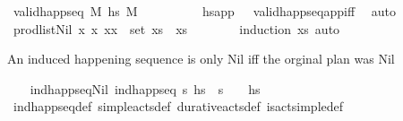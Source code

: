 \begin{isabellebody}
\ {\isachardoublequoteopen}valid{\isacharunderscore}{\kern0pt}happ{\isacharunderscore}{\kern0pt}seq\ M\ {\isacharquery}{\kern0pt}hs{\isacharprime}{\kern0pt}\ M{\isacharprime}{\kern0pt}{\isachardoublequoteclose}\isanewline
\ \ \ \ \ \ \ \ \isamarkupfalse%
\ hs{\isacharprime}{\kern0pt}{\isacharunderscore}{\kern0pt}app\ {}\ {}\ valid{\isacharunderscore}{\kern0pt}happ{\isacharunderscore}{\kern0pt}seq{\isacharunderscore}{\kern0pt}app{\isacharunderscore}{\kern0pt}iff\ \isamarkupfalse%
\ auto\isanewline
\ \ \ \ \isamarkupfalse%
\isanewline
\ \ \isamarkupfalse%
%
\endisatagproof
{\isafoldproof}%
%
\isadelimproof
\isanewline
%
\endisadelimproof
\isanewline
\ \ \isamarkupfalse%
\ prod{\isacharunderscore}{\kern0pt}list{\isacharunderscore}{\kern0pt}Nil{\isacharcolon}{\kern0pt}\ {\isachardoublequoteopen}{\isasymforall}x\ x\ {\isacharparenleft}{\kern0pt}xx\ {\isasymnotin}\ set\ xs\ {\isasymLongrightarrow}\ xs\ {\isacharequal}{\kern0pt}\ {\isacharbrackleft}{\kern0pt}{\isacharbrackright}{\kern0pt}{\isachardoublequoteclose}\isanewline
%
\isadelimproof
\ \ \ \ %
\endisadelimproof
%
\isatagproof
{}\isamarkupfalse%
\ {\isacharparenleft}{\kern0pt}induction\ xs{\isacharparenright}{\kern0pt}\ auto%
\endisatagproof
{\isafoldproof}%
%
\isadelimproof
%
\endisadelimproof
%
\begin{isamarkuptext}%
An induced happening sequence is only Nil iff the orginal plan was Nil%
\end{isamarkuptext}\isamarkuptrue%
\ \ \isamarkupfalse%
\ ind{\isacharunderscore}{\kern0pt}happ{\isacharunderscore}{\kern0pt}seq{\isacharunderscore}{\kern0pt}Nil{\isacharcolon}{\kern0pt}\ {\isachardoublequoteopen}ind{\isacharunderscore}{\kern0pt}happ{\isacharunderscore}{\kern0pt}seq\ {\isasympi}s\ hs\ {\isasymLongrightarrow}\ {\isasympi}s\ {\isacharequal}{\kern0pt}\ {\isacharbrackleft}{\kern0pt}{\isacharbrackright}{\kern0pt}\ {\isasymlongleftrightarrow}\ hs\ {\isacharequal}{\kern0pt}\ {\isacharbrackleft}{\kern0pt}{\isacharbrackright}{\kern0pt}{\isachardoublequoteclose}\isanewline
%
\isadelimproof
\ \ \ \ %
\endisadelimproof
%
\isatagproof
{}\isamarkupfalse%
\ ind{\isacharunderscore}{\kern0pt}happ{\isacharunderscore}{\kern0pt}seq{\isacharunderscore}{\kern0pt}def\ simple{\isacharunderscore}{\kern0pt}acts{\isacharunderscore}{\kern0pt}def\ durative{\isacharunderscore}{\kern0pt}acts{\isacharunderscore}{\kern0pt}def\ is{\isacharunderscore}{\kern0pt}act{\isacharunderscore}{\kern0pt}simple{\isacharunderscore}{\kern0pt}def\ \isanewline

\end{isabellebody}
